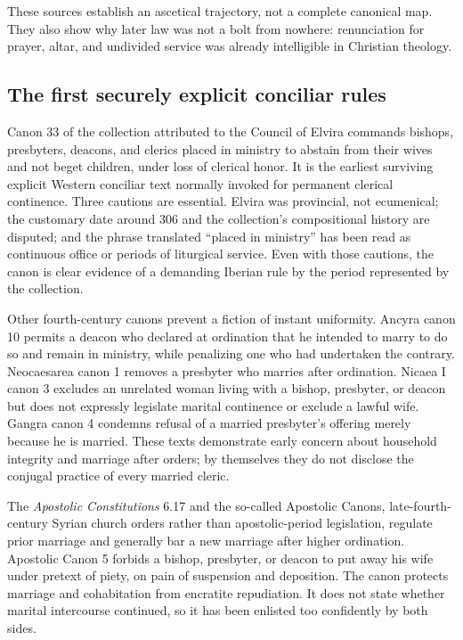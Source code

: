 These sources establish an ascetical trajectory, not a complete canonical map. They also show why later law was not a bolt from nowhere: renunciation for prayer, altar, and undivided service was already intelligible in Christian theology.

\subsection{The first securely explicit conciliar rules}

Canon 33 of the collection attributed to the Council of Elvira commands bishops, presbyters, deacons, and clerics placed in ministry to abstain from their wives and not beget children, under loss of clerical honor. It is the earliest surviving explicit Western conciliar text normally invoked for permanent clerical continence. Three cautions are essential. Elvira was provincial, not ecumenical; the customary date around 306 and the collection's compositional history are disputed; and the phrase translated ``placed in ministry'' has been read as continuous office or periods of liturgical service. Even with those cautions, the canon is clear evidence of a demanding Iberian rule by the period represented by the collection.

Other fourth-century canons prevent a fiction of instant uniformity. Ancyra canon 10 permits a deacon who declared at ordination that he intended to marry to do so and remain in ministry, while penalizing one who had undertaken the contrary. Neocaesarea canon 1 removes a presbyter who marries after ordination. Nicaea I canon 3 excludes an unrelated woman living with a bishop, presbyter, or deacon but does not expressly legislate marital continence or exclude a lawful wife. Gangra canon 4 condemns refusal of a married presbyter's offering merely because he is married. These texts demonstrate early concern about household integrity and marriage after orders; by themselves they do not disclose the conjugal practice of every married cleric.

The \emph{Apostolic Constitutions} 6.17 and the so-called Apostolic Canons, late-fourth-century Syrian church orders rather than apostolic-period legislation, regulate prior marriage and generally bar a new marriage after higher ordination. Apostolic Canon 5 forbids a bishop, presbyter, or deacon to put away his wife under pretext of piety, on pain of suspension and deposition. The canon protects marriage and cohabitation from encratite repudiation. It does not state whether marital intercourse continued, so it has been enlisted too confidently by both sides.

